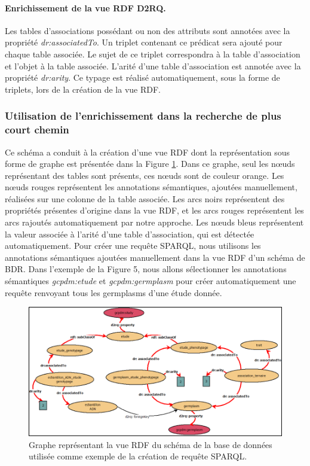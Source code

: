 \paragraph*{Enrichissement de la vue RDF D2RQ.}
Les tables d'associations possédant ou non des attributs sont annotées avec la propriété \textit{dr:associatedTo}. Un triplet contenant ce prédicat sera ajouté pour chaque table associée. Le sujet de ce triplet correspondra à la table d'association et l'objet à la table associée. L’arité d’une table d’association est annotée avec la propriété \textit{dr:arity}. Ce typage est réalisé automatiquement, sous la forme de triplets, lors de la création de la vue RDF.

\subsubsection*{Utilisation de l'enrichissement dans la recherche de plus court chemin}
Ce schéma a conduit à la création d'une vue RDF dont la représentation sous forme de graphe est présentée dans la Figure \ref{graph}. Dans ce graphe, seul les nœuds représentant des tables sont présents, ces nœuds sont de couleur orange. Les nœuds rouges représentent les annotations sémantiques, ajoutées manuellement, réalisées sur une colonne de la table associée. Les arcs noirs représentent des propriétés présentes d’origine dans la vue RDF, et les arcs rouges représentent les arcs rajoutés automatiquement par notre approche. Les nœuds bleus représentent la valeur associée à l’arité d’une table d’association, qui est détectée automatiquement. Pour créer une requête SPARQL, nous utilisons les annotations sémantiques ajoutées manuellement dans la vue RDF d'un schéma de BDR. Dans l’exemple de la Figure 5, nous allons sélectionner les annotations sémantiques \textit{gcpdm:etude} et \textit{gcpdm:germplasm} pour créer automatiquement une requête renvoyant tous les germplasms d'une étude donnée. 

\begin{figure}[!ht]
\begin{center}
	\includegraphics[width=1\textwidth]{Figures/biosemantic3.png}
\end{center}
\caption{\label{graph} Graphe représentant la vue RDF du schéma de la base de données utilisée comme exemple de la création de requête SPARQL.}
\end{figure}

